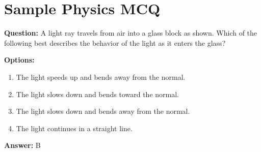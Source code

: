 \documentclass{}
\begin{document}
\section*{Sample Physics MCQ}

\textbf{Question:}  
A light ray travels from air into a glass block as shown. Which of the following best describes the behavior of the light as it enters the glass?

\begin{center}
\end{center}

\textbf{Options:}
\begin{enumerate}[label=\Alph*.]
    \item The light speeds up and bends away from the normal.  
    \item The light slows down and bends toward the normal.  
    \item The light slows down and bends away from the normal.  
    \item The light continues in a straight line.
\end{enumerate}

\vspace{1em}
\textbf{Answer:} B
\end{document}
